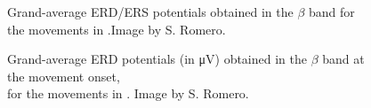 \documentclass[11pt]{exam}
\begin{document}
    \begin{figure}[htbp]
        \centering
        \caption{Grand-average ERD/ERS potentials obtained in the \(\beta\) band for\\the movements in \href{https://doi.org/10.1371/journal.pone.0182578}{}.Image by S. Romero.}
        \label{fig:ERD}
    \end{figure}

    \smallskip %
    \begin{figure}[htbp]
        \centering
        \caption{Grand-average ERD potentials (in \si{\micro\volt}) obtained in the \(\beta\) band at the movement onset,\\for the movements in \href{https://doi.org/10.1371/journal.pone.0182578}{}. Image by S. Romero.}
        \label{fig:ERDtopo}
    \end{figure}
\end{document}
